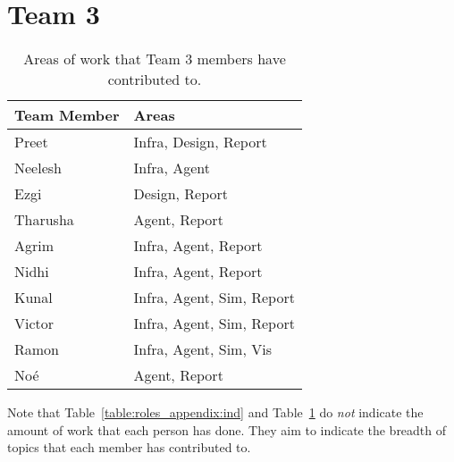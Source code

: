 \section{Team 3}
\label{sec:roles_appendix:team3}

\begin{table}[H]
    \centering
    \begin{tabular}{|l|l|}
    \hline
    \textbf{Team Member} & \textbf{Areas}     \\ \hline
    Preet  & Infra, Design, Report         \\
    Neelesh  & Infra, Agent                 \\
    Ezgi     & Design, Report        \\
    Tharusha     & Agent, Report \\
    Agrim    & Infra, Agent, Report                      \\
    Nidhi  & Infra, Agent, Report                        \\
    Kunal    & Infra, Agent, Sim, Report  \\
    Victor & Infra, Agent, Sim, Report  \\ 
    Ramon &  Infra, Agent, Sim, Vis \\
    Noé &   Agent, Report \\   \hline
\end{tabular}
\caption{Areas of work that Team 3 members have contributed to.}
\label{sec:roles_appendix:team1}
\end{table}



Note that Table~\ref{table:roles_appendix:ind} and Table~\ref{sec:roles_appendix:team3} do \emph{not} indicate the amount of work that each person has done. They aim to indicate the breadth of topics that each member has contributed to. 